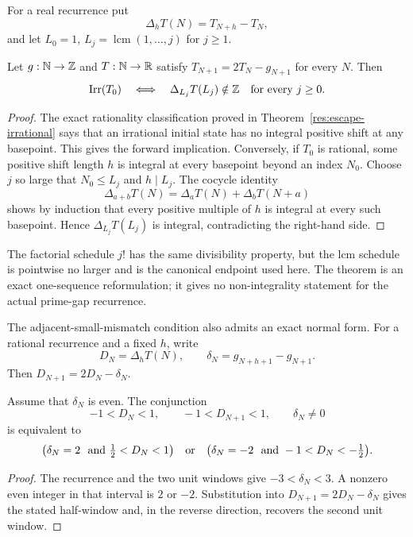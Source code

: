 \documentclass[11pt]{article}
\begin{document}
For a real recurrence put
\[
 \Delta_hT(N)=T_{N+h}-T_N,
\]
and let $L_0=1$, $L_j=\operatorname{lcm}(1,\ldots,j)$ for $j\ge1$.

\begin{theorem}\label{res:lcmdiagonal}
Let $g:\mathbb{N}\to\mathbb{Z}$ and $T:\mathbb{N}\to\mathbb{R}$ satisfy
$T_{N+1}=2T_N-g_{N+1}$ for every $N$.  Then
\[
 \operatorname{Irr}(T_0)
 \quad\Longleftrightarrow\quad
 \Delta_{L_j}T(L_j)\notin\mathbb{Z}
 \quad\hbox{for every }j\ge0.
\]
\end{theorem}

\begin{proof}
The exact rationality classification proved in
Theorem~\ref{res:escape-irrational} says that an irrational initial state has
no integral positive shift at any basepoint.  This gives the forward
implication.  Conversely, if $T_0$ is rational, some positive shift length
$h$ is integral at every basepoint beyond an index $N_0$.  Choose $j$ so large
that $N_0\le L_j$ and $h\mid L_j$.  The cocycle identity
\[
 \Delta_{a+b}T(N)=\Delta_aT(N)+\Delta_bT(N+a)
\]
shows by induction that every positive multiple of $h$ is integral at every
such basepoint.  Hence $\Delta_{L_j}T(L_j)$ is integral, contradicting the
right-hand side.
\end{proof}

The factorial schedule $j!$ has the same divisibility property, but the lcm
schedule is pointwise no larger and is the canonical endpoint used here.  The
theorem is an exact one-sequence reformulation; it gives no non-integrality
statement for the actual prime-gap recurrence.

The adjacent-small-mismatch condition also admits an exact normal form.  For a
rational recurrence and a fixed $h$, write
\[
 D_N=\Delta_hT(N),\qquad
 \delta_N=g_{N+h+1}-g_{N+1}.
\]
Then $D_{N+1}=2D_N-\delta_N$.

\begin{theorem}\label{res:signedwindow}
Assume that $\delta_N$ is even.  The conjunction
\[
 -1<D_N<1,\qquad -1<D_{N+1}<1,\qquad \delta_N\ne0
\]
is equivalent to
\[
 \bigl(\delta_N=2\ \hbox{ and }\tfrac12<D_N<1\bigr)
 \quad\hbox{or}\quad
 \bigl(\delta_N=-2\ \hbox{ and }-1<D_N<-\tfrac12\bigr).
\]
\end{theorem}

\begin{proof}
The recurrence and the two unit windows give $-3<\delta_N<3$.  A nonzero even
integer in that interval is $2$ or $-2$.  Substitution into
$D_{N+1}=2D_N-\delta_N$ gives the stated half-window and, in the reverse
direction, recovers the second unit window.
\end{proof}
\end{document}
